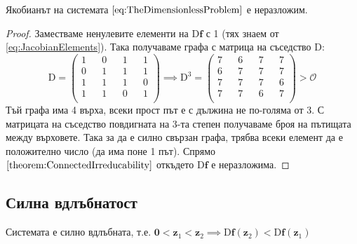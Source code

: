 \begin{proposition}
  Якобианът на системата $\ref{eq:TheDimensionlessProblem}$ е неразложим.
\end{proposition}
\begin{proof}
  Заместваме ненулевите елементи на $\mathrm{D} \mathbf{f}$ с 1 (тях знаем от \ref{eq:JacobianElements}). Така получаваме графа с матрица на съседство $\mathrm{D}$:
  \begin{equation}
    \mathrm{D} =
    \begin{pmatrix}
      1 && 0 && 1 && 1 \\
      0 && 1 && 1 && 1 \\
      1 && 1 && 1 && 0 \\
      1 && 1 && 0 && 1 \\
    \end{pmatrix}
    \implies
    \mathrm{D}^3 =
    \begin{pmatrix}
      7 && 6 && 7 && 7 \\
      6 && 7 && 7 && 7 \\
      7 && 7 && 7 && 6 \\
      7 && 7 && 6 && 7 \\
    \end{pmatrix}
    >
    \mathscr{O}
  \end{equation}
  Тъй графа има 4 върха, всеки прост път е с дължина не по-голяма от 3.
  С матрицата на съседство повдигната на 3-та степен получаваме броя на пътищата между върховете.
  Така за да е силно свързан графа, трябва всеки елемент да е положително число (да има поне 1 път).
  Спрямо $\ref{theorem:ConnectedIrreducability}$ откъдето $\mathrm{D}\mathbf{f}$ е неразложима.
  \end{proof}

\subsection{Силна вдлъбнатост}
\begin{proposition}
  Системата е силно вдлъбната, т.е. $\mathbf{0} < \mathbf{z}_1 < \mathbf{z}_2 \implies \mathrm{D}\mathbf{f}(\mathbf{z}_2) < \mathrm{D}\mathbf{f}(\mathbf{z}_1)$
\end{proposition}

